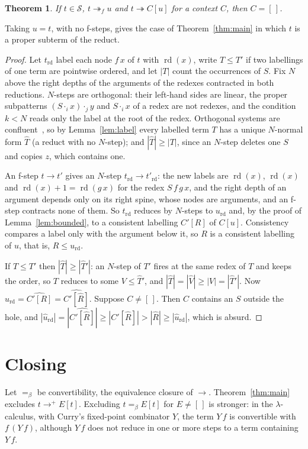 \documentclass[11pt]{amsart}
\newtheorem{theorem}{Theorem}
\newcommand{\Ter}{\mathcal S}
\newcommand{\red}{\twoheadrightarrow}
\newcommand{\conv}{=_\beta}
\newcommand{\rd}{\operatorname{rd}}
\newcommand{\lab}[1]{\mathbin{\cdot_{#1}}}
\begin{document}
\begin{theorem}\label{thm:f}
If $t\in\Ter$, $t\red_f u$ and $t\red C[u]$ for a context $C$, then $C=[\,]$.
\end{theorem}

\noindent Taking $u=t$, with no f-steps, gives the case of Theorem~\ref{thm:main} in which $t$ is a
proper subterm of the reduct.

\begin{proof}
Let $t_{\rd}$ label each node $f\,x$ of $t$ with $\rd(x)$, write $T\le T'$ if two labellings of one
term are pointwise ordered, and let $|T|$ count the occurrences of $S$. Fix $N$ above the right
depths of the arguments of the redexes contracted in both reductions. $N$-steps are orthogonal: their left-hand sides are linear, the
proper subpatterns $(S\lab i x)\lab j y$ and $S\lab i x$ of a redex are not redexes, and the
condition $k<N$ reads only the label at the root of the redex. Orthogonal systems are
confluent~\citep[Ch.~4]{terese}, so by Lemma~\ref{lem:label} every labelled term $T$ has a unique
$N$-normal form $\hat T$ (a reduct with no $N$-step); and $|\hat T|\ge|T|$, since an $N$-step deletes one $S$ and copies $z$,
which contains one.

An f-step $t\to t'$ gives an $N$-step $t_{\rd}\to t'_{\rd}$: the new labels are $\rd(x)$, $\rd(x)$ and
$\rd(x)+1=\rd(g\,x)$ for the redex $S\,f\,g\,x$, and the right depth of an argument depends only on
its right spine, whose nodes are arguments, and an f-step contracts none of them. So $t_{\rd}$ reduces
by $N$-steps to $u_{\rd}$ and, by the proof of Lemma~\ref{lem:bounded}, to a consistent labelling
$C'[R]$ of $C[u]$. Consistency compares a label only with the argument below it, so $R$ is a
consistent labelling of $u$, that is, $R\le u_{\rd}$.

If $T\le T'$ then $|\hat T|\ge|\hat T'|$: an $N$-step of $T'$ fires at the same redex of $T$ and
keeps the order, so $T$ reduces to some $V\le\hat T'$, and $|\hat T|=|\hat V|\ge|V|=|\hat T'|$.
Now $\hat u_{\rd}=\widehat{C'[R]}=\widehat{C'[\hat R]}$. Suppose $C\ne[\,]$. Then $C$ contains an
$S$ outside the hole, and $|\hat u_{\rd}|=|\widehat{C'[\hat R]}|\ge|C'[\hat R]|>|\hat R|\ge|\hat
u_{\rd}|$, which is absurd.
\end{proof}

\section{Closing}

Let $\conv$ be convertibility, the equivalence closure of $\to$. Theorem~\ref{thm:main} excludes $t\to^+E[t]$. Excluding $t\conv E[t]$ for $E\ne[\,]$ is stronger: in
the $\lambda$-calculus, with Curry's fixed-point combinator $Y$, the term $Y\,f$ is convertible with
$f\,(Y\,f)$, although $Y\,f$ does not reduce in one or more steps to a term containing $Y\,f$.
\end{document}
